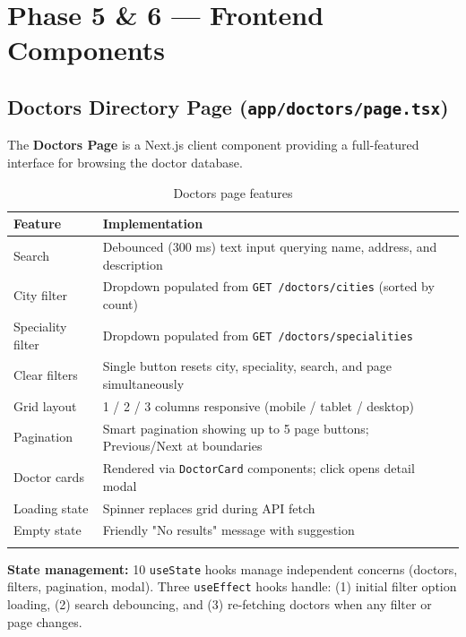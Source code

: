 \documentclass[12pt, a4paper]{article}
\newcommand{\file}[1]{\texttt{\color{accent}#1}}
\begin{document}
\section{Phase 5 \& 6 — Frontend Components}

\subsection{Doctors Directory Page (\file{app/doctors/page.tsx})}

The \textbf{Doctors Page} is a Next.js client component providing a
full-featured interface for browsing the doctor database.

\begin{longtable}{p{3.5cm} p{9.5cm}}
  \toprule
  \textbf{Feature} & \textbf{Implementation} \\
  \midrule
  Search           & Debounced (300 ms) text input querying name, address, and description \\[3pt]
  City filter      & Dropdown populated from \texttt{GET /doctors/cities} (sorted by count) \\[3pt]
  Speciality filter& Dropdown populated from \texttt{GET /doctors/specialities} \\[3pt]
  Clear filters    & Single button resets city, speciality, search, and page simultaneously \\[3pt]
  Grid layout      & 1 / 2 / 3 columns responsive (mobile / tablet / desktop) \\[3pt]
  Pagination       & Smart pagination showing up to 5 page buttons; Previous/Next at boundaries \\[3pt]
  Doctor cards     & Rendered via \texttt{DoctorCard} components; click opens detail modal \\[3pt]
  Loading state    & Spinner replaces grid during API fetch \\[3pt]
  Empty state      & Friendly "No results" message with suggestion \\
  \bottomrule
  \caption{Doctors page features}
\end{longtable}

\textbf{State management:} 10 \texttt{useState} hooks manage independent
concerns (doctors, filters, pagination, modal). Three \texttt{useEffect}
hooks handle: (1) initial filter option loading, (2) search debouncing,
and (3) re-fetching doctors when any filter or page changes.
\end{document}
